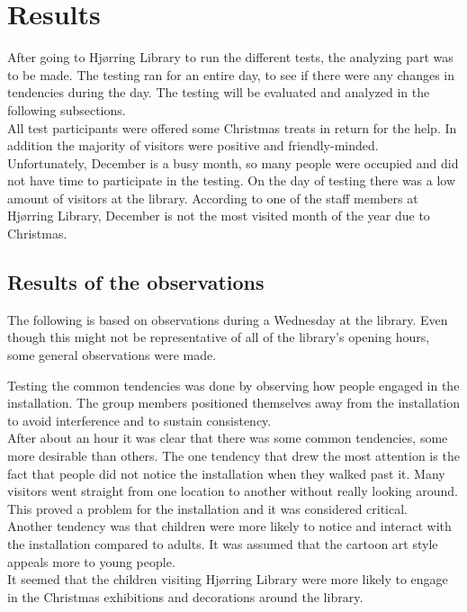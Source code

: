 \section{Results}
After going to Hj{\o}rring Library to run the different tests, the analyzing part was to be made. The testing ran for an entire day, to see if there were any changes in tendencies during the day. The testing will be evaluated and analyzed in the following subsections.\\
All test participants were offered some Christmas treats in return for the help. In addition the majority of visitors were positive and friendly-minded. Unfortunately, December is a busy month, so many people were occupied and did not have time to participate in the testing. On the day of testing there was a low amount of visitors at the library. According to one of the staff members at Hj{\o}rring Library, December is not the most visited month of the year due to Christmas.

\subsection{Results of the observations}
The following is based on observations during a Wednesday at the library. Even though this might not be representative of all of the library's opening hours, some general observations were made.

Testing the common tendencies was done by observing how people engaged in the installation. The group members positioned themselves away from the installation to avoid interference and to sustain consistency.\\ 
After about an hour it was clear that there was some common tendencies, some more desirable than others. The one tendency that drew the most attention is the fact that people did not notice the installation when they walked past it. Many visitors went straight from one location to another without really looking around. This proved a problem for the installation and it was considered critical.\\
Another tendency was that children were more likely to notice and interact with the installation compared to adults. It was assumed that the cartoon art style appeals more to young people.\\
It seemed that the children visiting Hj{\o}rring Library were more likely to engage in the Christmas exhibitions and decorations around the library.

